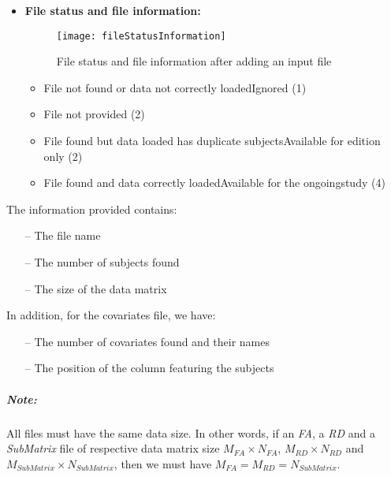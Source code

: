 \documentclass[fadttsterUserGuide_use]{subfiles}
\begin{document}
	\begin{itemize}
		\item \textbf{File status and file information:}
		\begin{figure}[H]
  			\texttt{[image: fileStatusInformation]}
  			\caption{File status and file information after adding an input file}
    		\label{fig:fileStatus}
		\end{figure}
		\begin{itemize}
			\item File not found or data not correctly loaded\textrightarrow Ignored (1)	
			\item File not provided (2)
			\item File found but data loaded has duplicate subjects\textrightarrow Available for edition only (2)
			\item File found and data correctly loaded\textrightarrow Available for the ongoing\newline study (4)
		\end{itemize}
	\end{itemize}
	The information provided contains:
	\begin{itemize}
			\item[--] The file name		
			\item[--] The number of subjects found
			\item[--] The size of the data matrix
	\end{itemize}
	In addition, for the covariates file, we have:
	\begin{itemize}
			\item[--] The number of covariates found and their names
			\item[--] The position of the column featuring the subjects
	\end{itemize}
	\subparagraph{\textbf{Note:}} All files must have the same data size. In other words, if an \textit{FA}, a \textit{RD} and a \textit{SubMatrix} file of respective data matrix size $M_{\textit{FA}}\times N_{\textit{FA}}$,  $M_{\textit{RD}}\times N_{\textit{RD}}$ and $M_{\textit{SubMatrix}}\times N_{\textit{SubMatrix}}$, then we must have $M_{\textit{FA}} = M_{\textit{RD}} = N_{\textit{SubMatrix}}$.
	\vfill
	\newpage
	
\end{document}
